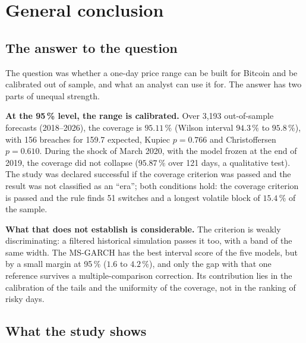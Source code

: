 \documentclass[12pt,a4paper]{article}
\begin{document}
\section{General conclusion}
\label{sec:conclusion}

\subsection{The answer to the question}

The question was whether a one-day price range can be built for Bitcoin and be calibrated out of sample, and what an analyst can use it for. The answer has two parts of unequal strength.

\textbf{At the 95\,\% level, the range is calibrated.} Over 3,193 out-of-sample forecasts (2018--2026), the coverage is $95.11\,\%$ (Wilson interval $94.3\,\%$ to $95.8\,\%$), with 156 breaches for 159.7 expected, Kupiec $p=0.766$ and Christoffersen $p=0.610$. During the shock of March 2020, with the model frozen at the end of 2019, the coverage did not collapse ($95.87\,\%$ over 121 days, a qualitative test). The study was declared successful if the coverage criterion was passed and the result was not classified as an ``era''; both conditions hold: the coverage criterion is passed and the rule finds 51 switches and a longest volatile block of $15.4\,\%$ of the sample.

\textbf{What that does not establish is considerable.} The criterion is weakly discriminating: a filtered historical simulation passes it too, with a band of the same width. The MS-GARCH has the best interval score of the five models, but by a small margin at 95\,\% ($1.6$ to $4.2\,\%$), and only the gap with that one reference survives a multiple-comparison correction. Its contribution lies in the calibration of the tails and the uniformity of the coverage, not in the ranking of risky days.

\subsection{What the study shows}
\end{document}
